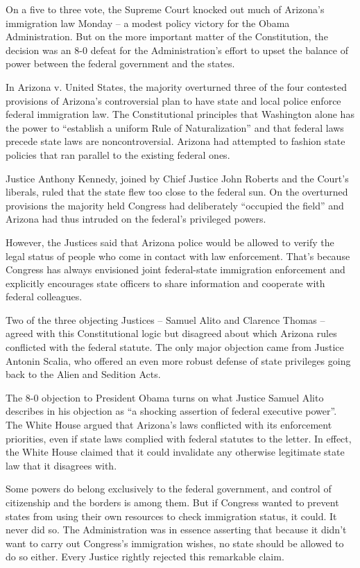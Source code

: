 On a five to three vote, the Supreme Court knocked out much of Arizona's immigration law Monday – a modest policy victory for the Obama Administration. But on the more important matter of the Constitution, the decision was an 8-0 defeat for the Administration's effort to upset the balance of power between the federal government and the states.


In Arizona v. United States, the majority overturned three of the four contested provisions of Arizona's controversial plan to have state and local police enforce federal immigration law. The Constitutional principles that Washington alone has the power to ``establish a uniform Rule of Naturalization'' and that federal laws precede state laws are noncontroversial. Arizona had attempted to fashion state policies that ran parallel to the existing federal ones.


Justice Anthony Kennedy, joined by Chief Justice John Roberts and the Court's liberals, ruled that the state flew too close to the federal sun. On the overturned provisions the majority held Congress had deliberately ``occupied the field'' and Arizona had thus intruded on the federal's privileged powers.


However, the Justices said that Arizona police would be allowed to verify the legal status of people who come in contact with law enforcement. That's because Congress has always envisioned joint federal-state immigration enforcement and explicitly encourages state officers to share information and cooperate with federal colleagues.


Two of the three objecting Justices – Samuel Alito and Clarence Thomas – agreed with this Constitutional logic but disagreed about which Arizona rules conflicted with the federal statute. The only major objection came from Justice Antonin Scalia, who offered an even more robust defense of state privileges going back to the Alien and Sedition Acts.


The 8-0 objection to President Obama turns on what Justice Samuel Alito describes in his objection as ``a shocking assertion of federal executive power''. The White House argued that Arizona's laws conflicted with its enforcement priorities, even if state laws complied with federal statutes to the letter. In effect, the White House claimed that it could invalidate any otherwise legitimate state law that it disagrees with.


Some powers do belong exclusively to the federal government, and control of citizenship and the borders is among them. But if Congress wanted to prevent states from using their own resources to check immigration status, it could. It never did so. The Administration was in essence asserting that because it didn't want to carry out Congress's immigration wishes, no state should be allowed to do so either. Every Justice rightly rejected this remarkable claim.
